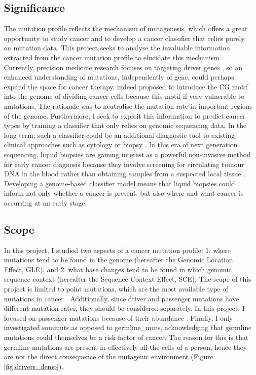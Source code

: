 

\subsection{Significance}
The mutation profile reflects the mechanism of mutagenesis, which offers a great opportunity to study cancer and to develop a cancer classifier that relies purely on mutation data. This project seeks to analyse the invaluable information extracted from the cancer mutation profile to elucidate this mechanism. Currently, precision medicine research focuses on targeting driver genes \citep{Mukherjee2019Genomics-GuidedCancer}, so an enhanced understanding of mutations, independently of gene, could perhaps expand the space for cancer therapy. \citet{Chowdhury2018PresenceNucleotides} indeed proposed to introduce the CG motif into the genome of dividing cancer cells because this motif if very vulnerable to mutations. The rationale was to neutralise the mutation rate in important regions of the genome. Furthermore, I seek to exploit this information to predict cancer types by training a \gls{classifier} that only relies on genomic sequencing data. In the long term, such a classifier could be an additional diagnostic tool to existing clinical approaches such as cytology or biopsy \citep{Stone1995Biopsy:Pitfalls}. In this era of next generation sequencing, liquid biopsies are gaining interest as a powerful non-invasive method for early cancer diagnosis because they involve screening for circulating tumour DNA in the blood rather than obtaining samples from a suspected local tissue \citep{Chen2019Next-generationDetection}. Developing a genome-based classifier model means that liquid biopsies could inform not only whether a cancer is present, but also where and what cancer is occurring at an early stage.  
\newpage
\subsection{Scope}
In this project, I studied two aspects of a cancer mutation profile: 1. where mutations tend to be found in the genome (hereafter the Genomic Location Effect, GLE), and 2. what base changes tend to be found in which genomic sequence context (hereafter the Sequence Context Effect, SCE). The scope of this project is limited to point mutations, which are the most available type of mutations in cancer \citep{Alexandrov2020}. Additionally, since driver and passenger mutations have different mutation rates, they should be considered separately. In this project, I focused on passenger mutations because of their abundance \citep{McFarland2014Tug-of-warProcesses}. Finally, I only investigated \glspl{sommut} as opposed to \glspl{germline_mut}, acknowledging that germline mutations could themselves be a risk factor of cancer. The reason for this is that germline mutations are present in effectively all the cells of a person, hence they are not the direct consequence of the mutagenic environment (Figure \ref{fig:drivers_demo}). 

